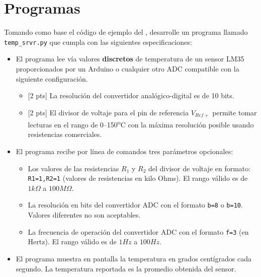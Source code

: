 %
%



\section{Programas}%
\label{sec:programs}

Tomando como base el código de ejemplo del , desarrolle un programa llamado \texttt{temp\_srvr.py} que cumpla con  las siguientes especificaciones:
\begin{itemize}
	\item{} El programa lee vía \IIC valores \textbf{discretos} de temperatura de un sensor LM35 proporcionados por un Arduino o cualquier otro ADC compatible con la siguiente configuración.

	\begin{itemize}
		\item{} [2 pts] La resolución del convertidor analógico-digital es de 10 bits.

		\item{} [2 pts] El divisor de voltaje para el pin de referencia $V_{Ref+}$ permite tomar lecturas en el rango de 0--150\textsuperscript{o}C con la máxima resolución posible usando resistencias comerciales.
	\end{itemize}

	\item{} El programa recibe por línea de comandos tres parámetros opcionales:
	\begin{itemize}
		\item Los valores de las resistencias $R_1$ y $R_2$ del divisor de voltaje en formato: \texttt{R1=1,R2=1} (valores de resistencias en kilo Ohms). El rango válido es de $1k\Omega$ a $100M\Omega$.
		\item La resolución en bits del convertidor ADC con el formato \texttt{b=8} o \texttt{b=10}. Valores diferentes no son aceptables.
		\item La frecuencia de operación del convertidor ADC con el formato \texttt{f=3} (en Hertz). El rango válido es de $1Hz$ a $100Hz$.
	\end{itemize}


	\item{} El programa muestra en pantalla la temperatura en grados centígrados cada segundo. La temperatura reportada es la promedio obtenida del sensor.


\end{itemize}
